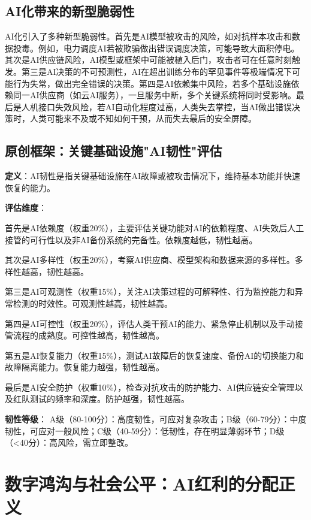 \subsection{AI化带来的新型脆弱性}

AI化引入了多种新型脆弱性。首先是AI模型被攻击的风险，如对抗样本攻击和数据投毒。例如，电力调度AI若被欺骗做出错误调度决策，可能导致大面积停电。其次是AI供应链风险，AI模型或框架中可能被植入后门，攻击者可在任意时刻触发。第三是AI决策的不可预测性，AI在超出训练分布的罕见事件等极端情况下可能行为失常，做出完全错误的决策。第四是AI依赖集中风险，若多个基础设施依赖同一AI供应商（如云AI服务），一旦服务中断，多个关键系统将同时受影响。最后是人机接口失效风险，若AI自动化程度过高，人类失去掌控，当AI做出错误决策时，人类可能来不及或不知如何干预，从而失去最后的安全屏障。

\subsection{原创框架：关键基础设施"AI韧性"评估}

\textbf{定义}：AI韧性是指关键基础设施在AI故障或被攻击情况下，维持基本功能并快速恢复的能力。

\textbf{评估维度}：

首先是AI依赖度（权重20\%），主要评估关键功能对AI的依赖程度、AI失效后人工接管的可行性以及非AI备份系统的完备性。依赖度越低，韧性越高。

其次是AI多样性（权重20\%），考察AI供应商、模型架构和数据来源的多样性。多样性越高，韧性越高。

第三是AI可观测性（权重15\%），关注AI决策过程的可解释性、行为监控能力和异常检测的时效性。可观测性越高，韧性越高。

第四是AI可控性（权重20\%），评估人类干预AI的能力、紧急停止机制以及手动接管流程的成熟度。可控性越高，韧性越高。

第五是AI恢复能力（权重15\%），测试AI故障后的恢复速度、备份AI的切换能力和故障隔离能力。恢复能力越强，韧性越高。

最后是AI安全防护（权重10\%），检查对抗攻击的防护能力、AI供应链安全管理以及红队测试的频率和深度。防护越强，韧性越高。

\textbf{韧性等级}：
A级（80-100分）：高度韧性，可应对复杂攻击；B级（60-79分）：中度韧性，可应对一般风险；C级（40-59分）：低韧性，存在明显薄弱环节；D级（<40分）：高风险，需立即整改。

\section{数字鸿沟与社会公平：AI红利的分配正义}

